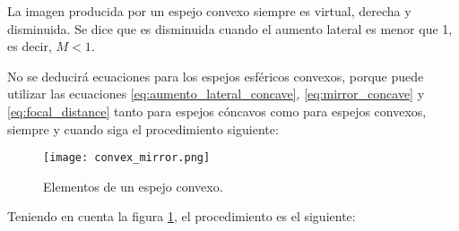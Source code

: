 La imagen producida por un espejo convexo siempre es virtual, derecha y disminuida. Se dice que es disminuida cuando el aumento lateral es menor que 1, es decir, \(M < 1\).

No se deducirá ecuaciones para los espejos esféricos convexos, porque puede utilizar las ecuaciones \ref{eq:aumento_lateral_concave}, \ref{eq:mirror_concave} y \ref{eq:focal_distance} tanto para espejos cóncavos como para espejos convexos, siempre y cuando siga el procedimiento siguiente:

\begin{figure}[ht]
  \centering
  \texttt{[image: convex\_mirror.png]}
  \caption{Elementos de un espejo convexo.}
  \label{fig:convex_mirror}
\end{figure}
Teniendo en cuenta la figura \ref{fig:convex_mirror}, el procedimiento es el siguiente:
